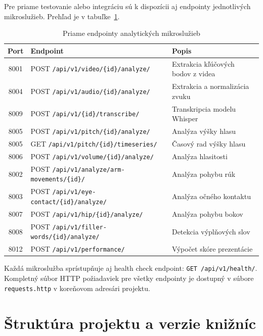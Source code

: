 Pre priame testovanie alebo integráciu sú k dispozícii aj endpointy jednotlivých mikroslužieb. Prehľad je v tabuľke~\ref{tab:td-ms-api}.

\begin{table}[ht]
\centering
\caption{Priame endpointy analytických mikroslužieb}
\label{tab:td-ms-api}
\begin{tabular}{|c|l|l|}
\hline
\textbf{Port} & \textbf{Endpoint} & \textbf{Popis} \\
\hline
8001 & POST \texttt{/api/v1/video/\{id\}/analyze/} & Extrakcia kľúčových bodov z videa \\
8004 & POST \texttt{/api/v1/audio/\{id\}/analyze/} & Extrakcia a normalizácia zvuku \\
8009 & POST \texttt{/api/v1/\{id\}/transcribe/} & Transkripcia modelu Whisper \\
8005 & POST \texttt{/api/v1/pitch/\{id\}/analyze/} & Analýza výšky hlasu \\
8005 & GET  \texttt{/api/v1/pitch/\{id\}/timeseries/} & Časový rad výšky hlasu \\
8006 & POST \texttt{/api/v1/volume/\{id\}/analyze/} & Analýza hlasitosti \\
8002 & POST \texttt{/api/v1/analyze/arm-movements/\{id\}/} & Analýza pohybu rúk \\
8003 & POST \texttt{/api/v1/eye-contact/\{id\}/analyze/} & Analýza očného kontaktu \\
8007 & POST \texttt{/api/v1/hip/\{id\}/analyze/} & Analýza pohybu bokov \\
8008 & POST \texttt{/api/v1/filler-words/\{id\}/analyze/} & Detekcia výplňových slov \\
8012 & POST \texttt{/api/v1/performance/} & Výpočet skóre prezentácie \\
\hline
\end{tabular}
\end{table}

Každá mikroslužba sprístupňuje aj health check endpoint: \texttt{GET /api/v1/health/}. Kompletný súbor HTTP požiadaviek pre všetky endpointy je dostupný v súbore \texttt{requests.http} v koreňovom adresári projektu.

\section{Štruktúra projektu a verzie knižníc}

